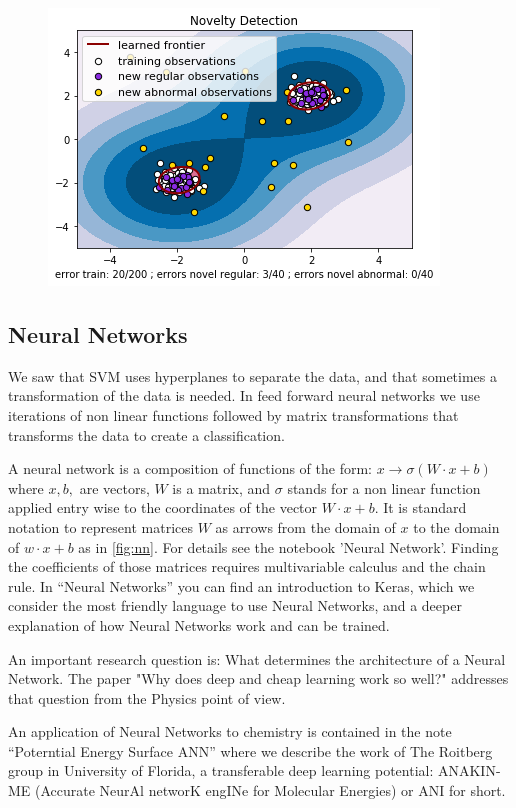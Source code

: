 \documentclass[11pt,letterpaper]{report}
\begin{document}
	\begin{figure}[h!]
		\centering
		\includegraphics[width=0.45\linewidth]{figures/novelty.png}
		\caption{}
		\label{fig:novelty}
	\end{figure} 
	
	\subsection{Neural Networks}  
	
	We saw that SVM uses  hyperplanes to separate the data, and that sometimes a transformation of the data is needed. In feed forward neural networks we use iterations of non linear functions followed by matrix transformations that transforms the data to create a classification.
	
	 A neural network is a composition of  functions of the form:
	$x\rightarrow \sigma(W\cdot x+b)$ where $x,b,$ are vectors, $W$ is a matrix, and $\sigma$ stands for a non linear function applied entry wise to the coordinates of the vector  $W\cdot x+b$.
	It is standard notation to represent matrices  $W$ as arrows from the domain of $x$ to the domain of $w\cdot x + b$ as in \ref{fig:nn}. For details see the notebook 'Neural Network'.
	 Finding the coefficients of those matrices requires multivariable calculus and the chain rule. In ``Neural Networks'' you can find an introduction to Keras, which we consider the most friendly language to use Neural Networks, and a deeper explanation of how Neural Networks work and can be trained.	
	
	An important research question is: What determines the architecture of a Neural Network.  The paper "Why does deep and cheap learning work so well?" \cite{Lin2017} addresses that question from the Physics point of view.
	
	
	An application of Neural Networks to chemistry is contained in the note ``Poterntial Energy Surface ANN'' where we describe the work of The Roitberg group in University of Florida, a transferable deep learning potential: ANAKIN-ME (Accurate NeurAl networK engINe for Molecular Energies) or ANI for short.
	
\end{document}
